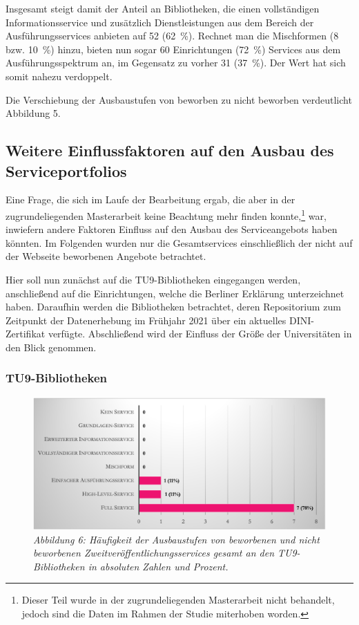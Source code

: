\documentclass[a4paper,
fontsize=11pt,
oneside,
numbers=noperiodatend,
parskip=half-,
bibliography=totoc,
final
]{scrartcl}
\begin{document}
Insgesamt steigt damit der Anteil an Bibliotheken, die einen
vollständigen Informationsservice und zusätzlich Dienstleistungen aus
dem Bereich der Ausführungsservices anbieten auf 52 (62~\%). Rechnet man
die Mischformen (8 bzw. 10~\%) hinzu, bieten nun sogar 60 Einrichtungen
(72~\%) Services aus dem Ausführungsspektrum an, im Gegensatz zu vorher
31 (37~\%). Der Wert hat sich somit nahezu verdoppelt.

Die Verschiebung der Ausbaustufen von beworben zu nicht beworben
verdeutlicht Abbildung 5.

\hypertarget{weitere-einflussfaktoren-auf-den-ausbau-des-serviceportfolios}{%
\subsection{Weitere Einflussfaktoren auf den Ausbau des
Serviceportfolios}\label{weitere-einflussfaktoren-auf-den-ausbau-des-serviceportfolios}}

Eine Frage, die sich im Laufe der Bearbeitung ergab, die aber in der
zugrundeliegenden Masterarbeit keine Beachtung mehr finden
konnte,\footnote{Dieser Teil wurde in der zugrundeliegenden Masterarbeit
  nicht behandelt, jedoch sind die Daten im Rahmen der Studie miterhoben
  worden.} war, inwiefern andere Faktoren Einfluss auf den Ausbau des
Serviceangebots haben könnten. Im Folgenden wurden nur die
Gesamtservices einschließlich der nicht auf der Webseite beworbenen
Angebote betrachtet.

Hier soll nun zunächst auf die TU9-Bibliotheken eingegangen werden,
anschließend auf die Einrichtungen, welche die Berliner Erklärung
unterzeichnet haben. Daraufhin werden die Bibliotheken betrachtet, deren
Repositorium zum Zeitpunkt der Datenerhebung im Frühjahr 2021 über ein
aktuelles DINI-Zertifikat verfügte. Abschließend wird der Einfluss der
Größe der Universitäten in den Blick genommen.

\hypertarget{tu9-bibliotheken}{%
\subsubsection{TU9-Bibliotheken}\label{tu9-bibliotheken}}

\begin{figure}[h!]
\centering
\includegraphics[width=.9\textwidth]{img/abb6.png}
\caption{\textit{Abbildung 6: Häufigkeit der Ausbaustufen von beworbenen und
nicht beworbenen Zweitveröffentlichungsservices gesamt an den
TU9-Bibliotheken in absoluten Zahlen und Prozent.}}
\end{figure}
\end{document}
